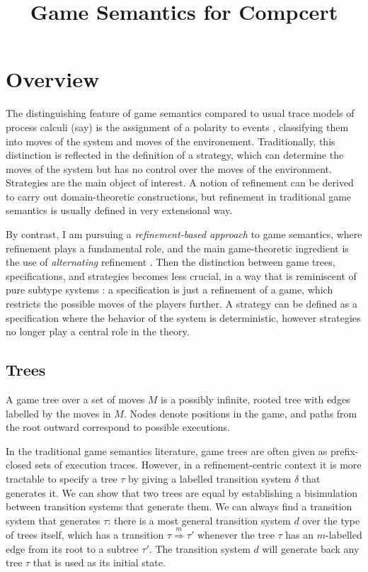 \documentclass[11pt]{article}
\title{Game Semantics for Compcert}
\begin{document}
\maketitle

\section{Overview}

The distinguishing feature of game semantics
compared to usual trace models of process calculi (say)
is the assignment of a polarity to events \cite{cspgs},
classifying them into moves of the system
and moves of the environement.
Traditionally,
this distinction is reflected in the definition of a strategy,
which can determine the moves of the system
but has no control over the moves of the environment.
Strategies are the main object of interest.
A notion of refinement can be derived
to carry out domain-theoretic constructions,
but refinement in traditional game semantics
is usually defined in very extensional way.

By contrast,
I am pursuing a \emph{refinement-based approach} to game semantics,
where refinement plays a fundamental role,
and the main game-theoretic ingredient is the use of
\emph{alternating} refinement \cite{altref}.
Then
the distinction between game trees, specifications, and strategies
becomes less crucial,
in a way that is reminiscent of pure subtype systems \cite{pts}:
a specification is just a refinement of a game,
which restricts the possible moves of the players further.
A strategy can be defined as
a specification where the behavior of the system is deterministic,
however strategies no longer play a central role in the theory.

\subsection{Trees}

A game tree over a set of moves $M$
is a possibly infinite, rooted tree
with edges labelled by the moves in $M$.
Nodes denote positions in the game, and
paths from the root outward correspond to
possible executions.

In the traditional game semantics literature,
game trees are often given as prefix-closed sets of
execution traces.
However, in a refinement-centric context it is more tractable
to specify a tree $\tau$ by giving
a labelled transition system $\delta$ that generates it.
We can show that two trees are equal by
establishing a bisimulation between transition systems that generate them.
We can always find a transition system that generates $\tau$:
there is a most general transition system $d$
over the type of trees itself,
which has a transition
$\tau \stackrel{m}{\Longrightarrow} \tau'$
whenever the tree $\tau$ has an $m$-labelled edge
from its root to a subtree $\tau'$.
The transition system $d$ will generate back any
tree $\tau$ that is used as its initial state.
\end{document}
